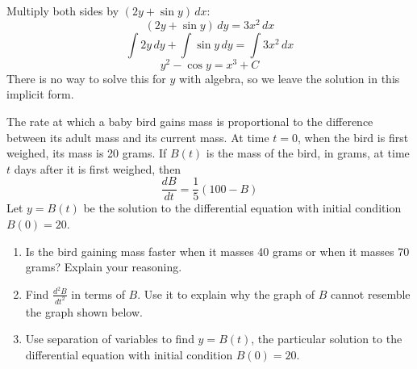 \begin{Answer}[ref = diffeq1]
	Multiply both sides by $(2y + \sin{y})\,dx$:
	$$(2y + \sin{y})\,dy = 3x^2\,dx$$
	$$\int 2y\,dy + \int \sin{y}\,dy = \int 3x^2\,dx$$
	$$y^2 - \cos{y} = x^3 + C$$
	There is no way to solve this for $y$ with algebra, so we leave the
	solution in this implicit form.
\end{Answer}

\begin{Exercise} The rate at which a baby bird gains 
mass is proportional to the difference between its adult mass and its current 
mass. At time $t = 0$, when the bird is first weighed, its mass is 20 grams. 
If $B(t)$ is the mass of the bird, in grams, at time $t$ days after it is 
first weighed, then $$\frac{dB}{dt} = \frac{1}{5} \left( 100 - B \right)$$
Let $y = B(t)$ be the solution to the differential equation with initial 
condition $B(0) = 20$. 
\begin{enumerate}
\item Is the bird gaining mass faster when it masses 40 grams or when it 
masses 70 grams? Explain your reasoning.
\item Find $\frac{d^2 B}{dt^2}$ in terms of $B$. Use it to explain why the 
graph of $B$ cannot resemble the graph shown below. 
\item Use separation of variables to find $y = B(t)$, the particular solution 
to the differential equation with initial condition $B(0) = 20$. 
\end{enumerate}
\end{Exercise}

